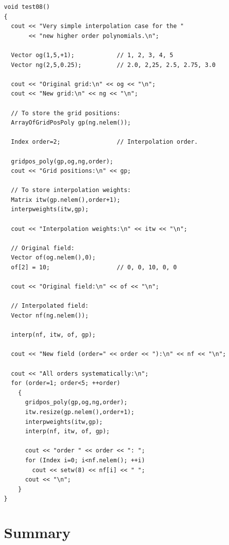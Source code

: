 \begin{verbatim}
void test08()
{
  cout << "Very simple interpolation case for the "
       << "new higher order polynomials.\n";

  Vector og(1,5,+1);            // 1, 2, 3, 4, 5
  Vector ng(2,5,0.25);          // 2.0, 2,25, 2.5, 2.75, 3.0

  cout << "Original grid:\n" << og << "\n";
  cout << "New grid:\n" << ng << "\n";

  // To store the grid positions:
  ArrayOfGridPosPoly gp(ng.nelem());

  Index order=2;                // Interpolation order.

  gridpos_poly(gp,og,ng,order);
  cout << "Grid positions:\n" << gp;

  // To store interpolation weights:
  Matrix itw(gp.nelem(),order+1);
  interpweights(itw,gp);
    
  cout << "Interpolation weights:\n" << itw << "\n";

  // Original field:
  Vector of(og.nelem(),0);
  of[2] = 10;                   // 0, 0, 10, 0, 0

  cout << "Original field:\n" << of << "\n";

  // Interpolated field:
  Vector nf(ng.nelem());

  interp(nf, itw, of, gp);

  cout << "New field (order=" << order << "):\n" << nf << "\n";  

  cout << "All orders systematically:\n";
  for (order=1; order<5; ++order)
    {
      gridpos_poly(gp,og,ng,order);
      itw.resize(gp.nelem(),order+1);
      interpweights(itw,gp);
      interp(nf, itw, of, gp);

      cout << "order " << order << ": ";
      for (Index i=0; i<nf.nelem(); ++i)
        cout << setw(8) << nf[i] << " ";
      cout << "\n";
    }
}
\end{verbatim}



\section{Summary}

